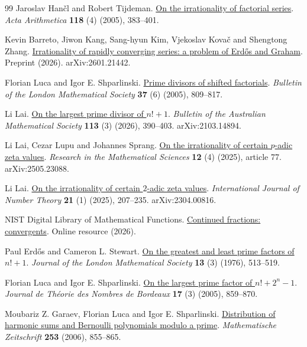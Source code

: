 \begin{thebibliography}{99}
Jaroslav Han{\v c}l and Robert Tijdeman. \href{https://doi.org/10.4064/aa118-4-5}{On the irrationality of factorial series}.
\emph{Acta Arithmetica} \textbf{118} (4) (2005), 383--401.

Kevin Barreto, Jiwon Kang, Sang-hyun Kim, Vjekoslav Kova{\v c} and Shengtong Zhang. \href{https://arxiv.org/abs/2601.21442v3}{Irrationality of rapidly converging series: a problem of {Erd{\H o}s} and {Graham}}.
Preprint (2026). arXiv:2601.21442.

Florian Luca and Igor E. Shparlinski. \href{https://doi.org/10.1112/S0024609305004923}{Prime divisors of shifted factorials}.
\emph{Bulletin of the London Mathematical Society} \textbf{37} (6) (2005), 809--817.

Li Lai. \href{https://doi.org/10.1017/S0004972725100543}{On the largest prime divisor of {$n!+1$}}.
\emph{Bulletin of the Australian Mathematical Society} \textbf{113} (3) (2026), 390--403. arXiv:2103.14894.

Li Lai, Cezar Lupu and Johannes Sprang. \href{https://doi.org/10.1007/s40687-025-00559-x}{On the irrationality of certain {$p$}-adic zeta values}.
\emph{Research in the Mathematical Sciences} \textbf{12} (4) (2025), article 77. arXiv:2505.23088.

Li Lai. \href{https://doi.org/10.1142/S1793042125500113}{On the irrationality of certain {$2$}-adic zeta values}.
\emph{International Journal of Number Theory} \textbf{21} (1) (2025), 207--235. arXiv:2304.00816.

{NIST Digital Library of Mathematical Functions}. \href{https://dlmf.nist.gov/1.12}{Continued fractions: convergents}.
Online resource (2026).

Paul Erd{\H o}s and Cameron L. Stewart. \href{https://doi.org/10.1112/jlms/s2-13.3.513}{On the greatest and least prime factors of {$n!+1$}}.
\emph{Journal of the London Mathematical Society} \textbf{13} (3) (1976), 513--519.

Florian Luca and Igor E. Shparlinski. \href{https://doi.org/10.5802/jtnb.524}{On the largest prime factor of {$n!+2^n-1$}}.
\emph{Journal de Th{\'e}orie des Nombres de Bordeaux} \textbf{17} (3) (2005), 859--870.

Moubariz Z. Garaev, Florian Luca and Igor E. Shparlinski. \href{https://doi.org/10.1007/s00209-006-0939-5}{Distribution of harmonic sums and {Bernoulli} polynomials modulo a prime}.
\emph{Mathematische Zeitschrift} \textbf{253} (2006), 855--865.


\end{thebibliography}

